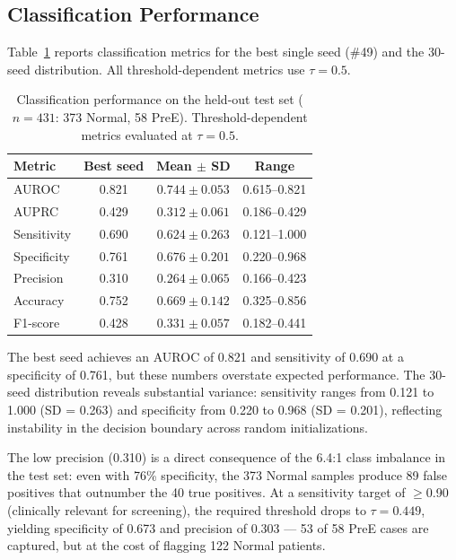 \documentclass[sigconf,nonacm]{acmart}
\begin{document}
\subsection{Classification Performance}
\label{sec:classification-perf}

Table~\ref{tab:classification} reports classification metrics for the best single seed (\#49) and the 30-seed distribution. All threshold-dependent metrics use $\tau{=}0.5$.

\begin{table}[H]
\centering
\caption{Classification performance on the held-out test set ($n{=}431$: 373 Normal, 58 PreE). Threshold-dependent metrics evaluated at $\tau{=}0.5$.}
\label{tab:classification}
\small
\begin{tabular}{lccc}
\toprule
Metric & Best seed & Mean $\pm$ SD & Range \\
\midrule
AUROC       & 0.821 & $0.744 \pm 0.053$ & 0.615--0.821 \\
AUPRC       & 0.429 & $0.312 \pm 0.061$ & 0.186--0.429 \\
Sensitivity & 0.690 & $0.624 \pm 0.263$ & 0.121--1.000 \\
Specificity & 0.761 & $0.676 \pm 0.201$ & 0.220--0.968 \\
Precision   & 0.310 & $0.264 \pm 0.065$ & 0.166--0.423 \\
Accuracy    & 0.752 & $0.669 \pm 0.142$ & 0.325--0.856 \\
F1-score    & 0.428 & $0.331 \pm 0.057$ & 0.182--0.441 \\
\bottomrule
\end{tabular}
\end{table}

The best seed achieves an AUROC of 0.821 and sensitivity of 0.690 at a specificity of 0.761, but these numbers overstate expected performance. The 30-seed distribution reveals substantial variance: sensitivity ranges from 0.121 to 1.000 (SD = 0.263) and specificity from 0.220 to 0.968 (SD = 0.201), reflecting instability in the decision boundary across random initializations.

The low precision (0.310) is a direct consequence of the 6.4:1 class imbalance in the test set: even with 76\% specificity, the 373 Normal samples produce 89 false positives that outnumber the 40 true positives. At a sensitivity target of $\geq$0.90 (clinically relevant for screening), the required threshold drops to $\tau{=}0.449$, yielding specificity of 0.673 and precision of 0.303 --- 53 of 58 PreE cases are captured, but at the cost of flagging 122 Normal patients.
\end{document}
